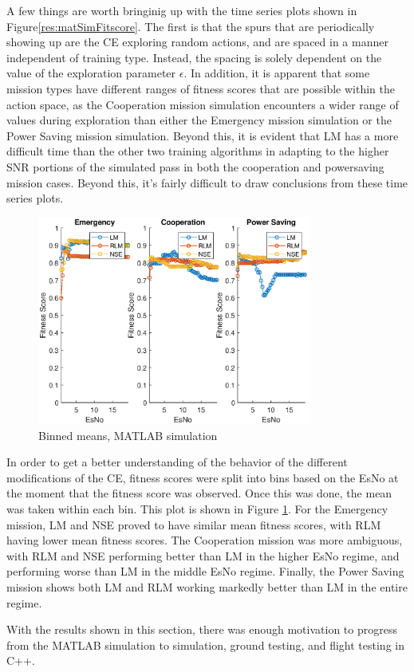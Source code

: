 \par A few things are worth bringinig up with the time series plots shown in Figure\ref{res:matSimFitscore}. The first is that the spurs that are periodically showing up are the CE exploring random actions, and are spaced in a manner independent of training type. Instead, the spacing is solely dependent on the value of the exploration parameter $\epsilon$. In addition, it is apparent that some mission types have different ranges of fitness scores that are possible within the action space, as the Cooperation mission simulation encounters a wider range of values during exploration than either the Emergency mission simulation or the Power Saving mission simulation. Beyond this, it is evident that LM has a more difficult time than the other two training algorithms in adapting to the higher SNR portions of the simulated pass in both the cooperation and powersaving mission cases. Beyond this, it's fairly difficult to draw conclusions from these time series plots.
\begin{figure}[!ht]
\centering
\includegraphics[width=0.8\textwidth]{figures/matlab_sim_results/binnedMeans_sim.eps}
\caption{Binned means, MATLAB simulation}
\label{res:matSimBinMean}
\end{figure}
\par In order to get a better understanding of the behavior of the different modifications of the CE, fitness scores were split into bins based on the EsNo at the moment that the fitness score was observed. Once this was done, the mean was taken within each bin. This plot is shown in Figure \ref{res:matSimBinMean}. For the Emergency mission, LM and NSE proved to have similar mean fitness scores, with RLM having lower mean fitness scores. The Cooperation mission was more ambiguous, with RLM and NSE performing better than LM in the higher EsNo regime, and performing worse than LM in the middle EsNo regime. Finally, the Power Saving mission shows both LM and RLM working markedly better than LM in the entire regime.
\par With the results shown in this section, there was enough motivation to progress from the MATLAB simulation to simulation, ground testing, and flight testing in C++. 
\clearpage
